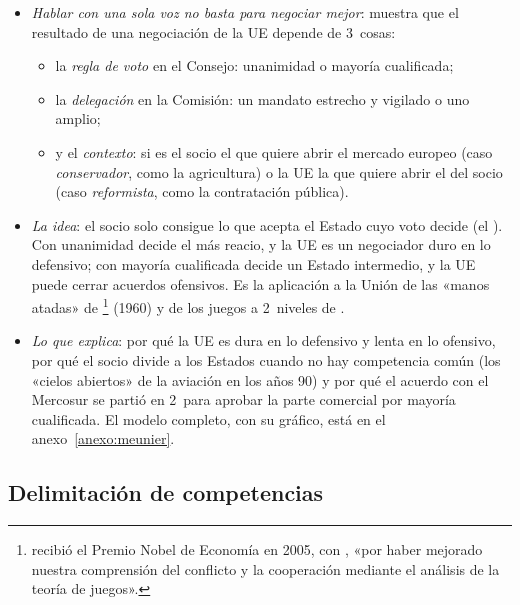 \documentclass[11pt]{article}
\begin{document}
\begin{itemize}
\item \emph{Hablar con una sola voz no basta para negociar mejor}: \textcite{Meunier2005Trading} muestra que el resultado de una negociación de la UE depende de 3~cosas:
  \begin{itemize}
  \item la \emph{regla de voto} en el Consejo: unanimidad o mayoría cualificada;
  \item la \emph{delegación} en la Comisión: un mandato estrecho y vigilado o uno amplio;
  \item y el \emph{contexto}: si es el socio el que quiere abrir el mercado europeo (caso \emph{conservador}, como la agricultura) o la UE la que quiere abrir el del socio (caso \emph{reformista}, como la contratación pública).
  \end{itemize}
\item \emph{La idea}: el socio solo consigue lo que acepta el Estado cuyo voto decide (el ). Con unanimidad decide el más reacio, y la UE es un negociador duro en lo defensivo; con mayoría cualificada decide un Estado intermedio, y la UE puede cerrar acuerdos ofensivos. Es la aplicación a la Unión de las «manos atadas» de \footnote{ recibió el Premio Nobel de Economía en 2005, con , «por haber mejorado nuestra comprensión del conflicto y la cooperación mediante el análisis de la teoría de juegos»\nocite{Nobel2005AumannSchelling}.} (1960)\nocite{Schelling1960Strategy} y de los juegos a 2~niveles de \textcite{Putnam1988Diplomacy}.
\item \emph{Lo que explica}: por qué la UE es dura en lo defensivo y lenta en lo ofensivo, por qué el socio divide a los Estados cuando no hay competencia común (los «cielos abiertos» de la aviación en los años 90) y por qué el acuerdo con el Mercosur se partió en 2~para aprobar la parte comercial por mayoría cualificada. El modelo completo, con su gráfico, está en el anexo~\ref{anexo:meunier}.
\end{itemize}

\subsection{Delimitación de competencias}\label{sec:delimitacion}
\end{document}
